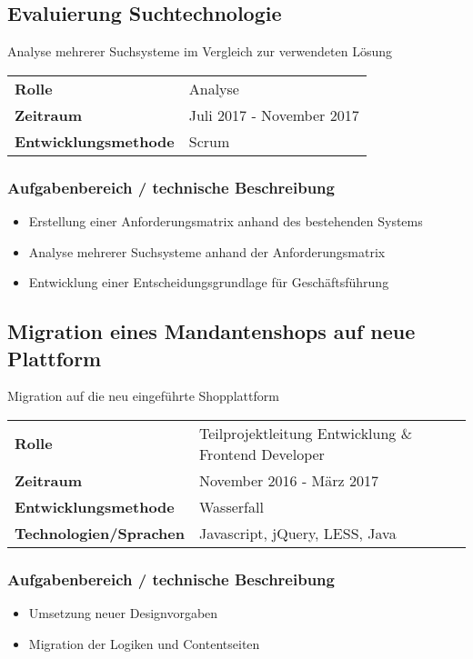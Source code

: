 \documentclass[10pt,ngerman,a4paper]{article}
\begin{document}
\subsection{Evaluierung Suchtechnologie}
Analyse mehrerer Suchsysteme im Vergleich zur verwendeten Lösung

\begin{tabular}{ll}
\textbf{Rolle} & Analyse \\
\textbf{Zeitraum} & Juli 2017 - November 2017\\
\textbf{Entwicklungsmethode} & Scrum
\end{tabular}

\subsubsection{Aufgabenbereich / technische Beschreibung}
\begin{itemize}
\item Erstellung einer Anforderungsmatrix anhand des bestehenden Systems
\item Analyse mehrerer Suchsysteme anhand der Anforderungsmatrix
\item Entwicklung einer Entscheidungsgrundlage für Geschäftsführung
\end{itemize}

\subsection{Migration eines Mandantenshops auf neue Plattform}
Migration auf die neu eingeführte Shopplattform

\begin{tabular}{ll}
\textbf{Rolle} & Teilprojektleitung Entwicklung \& Frontend Developer \\
\textbf{Zeitraum} & November 2016 - März 2017\\
\textbf{Entwicklungsmethode} & Wasserfall\\
\textbf{Technologien/Sprachen} & Javascript, jQuery, LESS, Java\\
\end{tabular}

\subsubsection{Aufgabenbereich / technische Beschreibung}
\begin{itemize}
\item Umsetzung neuer Designvorgaben
\item Migration der Logiken und Contentseiten
\end{itemize}
\end{document}
